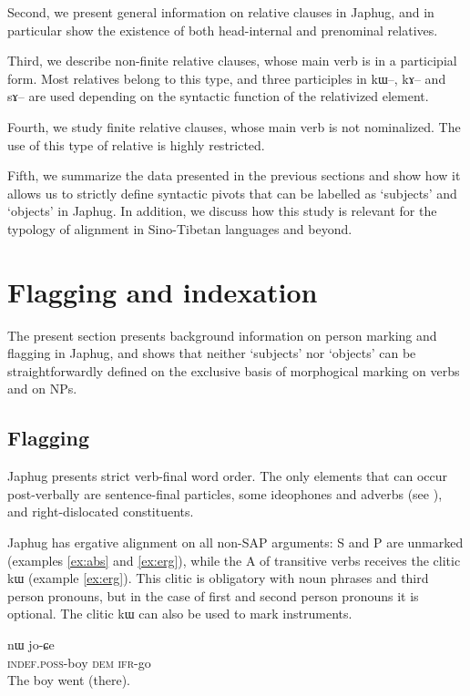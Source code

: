 \documentclass[oldfontcommands,oneside,a4paper,11pt]{article}
\newcommand{\ipa}[1]{{\phon #1}} %
\begin{document}
Second, we present general information on relative clauses in Japhug, and in particular show the existence of both head-internal and prenominal relatives.

Third, we describe   non-finite relative clauses, whose main verb is in a participial form. Most relatives belong to this type, and three participles in \ipa{kɯ--}, \ipa{kɤ--} and \ipa{sɤ--} are used depending on the syntactic function of the relativized element.

Fourth, we study finite relative clauses,  whose main verb is not nominalized. The use of this type of relative is highly restricted.

Fifth, we summarize the data presented in the previous sections and show how it allows us to strictly define syntactic pivots that can be labelled as `subjects' and `objects' in Japhug. In addition, we discuss how this study is relevant for the typology of alignment in Sino-Tibetan languages and beyond.



\section{Flagging and indexation} \label{sec:flagging.indexation}
The present section presents background information on person marking and flagging in Japhug, and shows that neither `subjects' nor `objects' can be straightforwardly defined on the exclusive basis of morphogical marking on  verbs and on NPs.


\subsection{Flagging}
Japhug presents strict verb-final word order. The only elements that can occur post-verbally are sentence-final particles, some ideophones and adverbs (see \citealt[275-6]{japhug14ideophones}), and right-dislocated constituents.

Japhug has ergative alignment on all non-SAP arguments:  S and P are unmarked (examples \ref{ex:abs} and \ref{ex:erg}), while the A of transitive verbs receives the clitic \ipa{kɯ} (example \ref{ex:erg}). This clitic is obligatory with noun phrases and third person pronouns, but in the case of first and second person pronouns it is optional. The clitic \ipa{kɯ} can also be used to mark instruments.

\begin{exe}
\ex \label{ex:abs}
\gll \ipa{tɤ-tɕɯ}  	\ipa{nɯ}  	 	\ipa{jo-ɕe}   \\
\textsc{indef.poss}-boy \textsc{dem}   \textsc{ifr}-go \\
\glt The boy went (there).
\end{exe}
\end{document}
